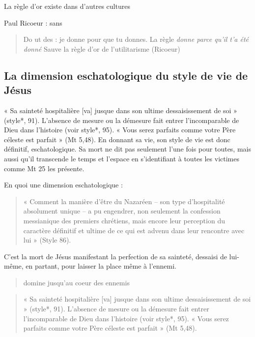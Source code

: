 La règle d'or existe dans d'autres cultures 


Paul Ricoeur : sans 
\begin{quote}
    Do ut des : je donne pour que tu donnes. La règle \textit{donne parce qu'il t'a été donné} Sauve la règle d'or de l'utilitarisme (Ricoeur)
\end{quote}


\subsection{La dimension eschatologique du style de vie de Jésus}

\begin{Def}
« Sa sainteté hospitalière [va] jusque dans son ultime
dessaisissement de soi » (style*, 91). L’absence de mesure ou la démesure fait entrer
l’incomparable de Dieu dans l’histoire (voir style*, 95). « Vous serez parfaits comme votre
Père céleste est parfait » (Mt 5,48). En donnant sa vie, son style de vie est donc définitif,
eschatologique. Sa mort ne dit pas seulement l’une fois pour toutes, mais aussi qu’il
transcende le temps et l’espace en s’identifiant à toutes les victimes comme Mt 25 les
présente.
\end{Def}

 En quoi une dimension eschatologique : 


 \begin{quote}
     « Comment la manière d’être du Nazaréen – son type d’hospitalité absolument unique – a pu engendrer, non seulement la confession messianique des premiers chrétiens, mais encore leur perception du caractère définitif et ultime de ce qui est advenu dans leur rencontre avec lui » (Style 86).
 \end{quote}

C'est la mort de Jésus manifestant la perfection de sa sainteté, dessaisi de lui-même, en partant, pour laisser la place même à l'ennemi.
\begin{quote}
    domine jusqu'au coeur des ennemis
\end{quote}

 


\begin{quote}
    « Sa sainteté hospitalière [va] jusque dans son ultime dessaisissement de soi » (style*, 91). L’absence de mesure ou la démesure fait entrer l’incomparable de Dieu dans l’histoire (voir style*, 95). « Vous serez parfaits comme votre Père céleste est parfait » (Mt 5,48).
\end{quote}

